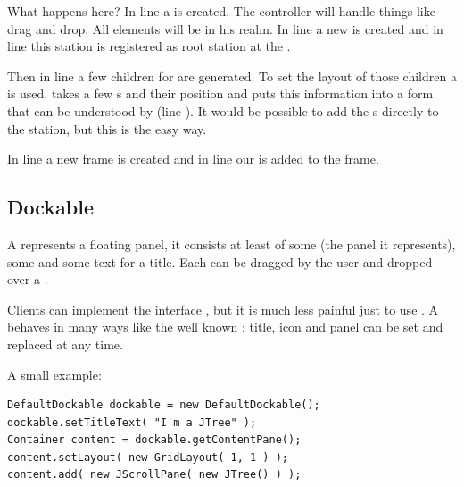 What happens here? In line  a  is created. The controller will handle things like drag and drop. All elements will be in his realm. In line  a new  is created and in line  this station is registered as root station at the .

Then in line  a few children for  are generated. To set the layout of those children a  is used.  takes a few s and their position and puts this information into a form that can be understood by  (line ). It would be possible to add the s directly to the station, but this is the easy way.

In line  a new frame is created and in line  our  is added to the frame.



\subsection{Dockable}
A  represents a floating panel, it consists at least of some  (the panel it represents), some  and some text for a title. Each  can be dragged by the user and dropped over a .

Clients can implement the interface , but it is much less painful just to use . A  behaves in many ways like the well known : title, icon and panel can be set and replaced at any time.

A small example:
\begin{lstlisting}
DefaultDockable dockable = new DefaultDockable();
dockable.setTitleText( "I'm a JTree" );
Container content = dockable.getContentPane();
content.setLayout( new GridLayout( 1, 1 ) );
content.add( new JScrollPane( new JTree() ) );
\end{lstlisting}


